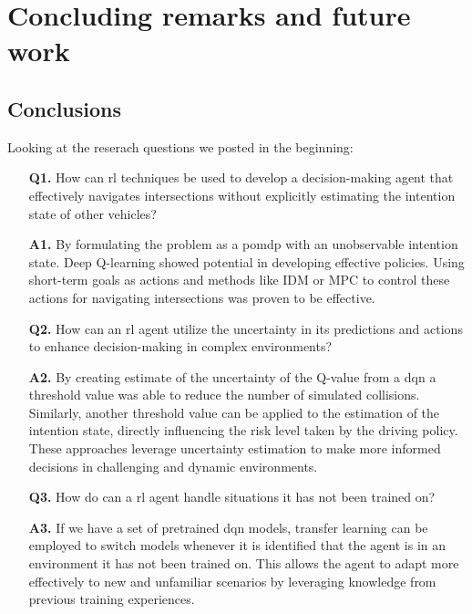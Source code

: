 \chapter{Concluding remarks and future work}
\section{Conclusions}\label{ch:conclusion}
Looking at the reserach questions we posted in the beginning: 
\begin{enumerate}
	\item[\textbf{Q1.}] How can \gls{rl} techniques be used to develop a decision-making agent that effectively navigates intersections without explicitly estimating the intention state of other vehicles? 
	\item[\textbf{A1.}]By formulating the problem as a \gls{pomdp} with an unobservable intention state. Deep Q-learning showed potential in developing effective policies. Using short-term goals as actions and methods like IDM or MPC to control these actions for navigating intersections was proven to be effective.
	\item[\textbf{Q2.}] How can an \gls{rl} agent utilize the uncertainty in its predictions and actions to enhance decision-making in complex environments? 
	\item[\textbf{A2.}] By creating estimate of the uncertainty of the Q-value from a \gls{dqn} a threshold value was able to reduce the number of simulated collisions. Similarly, another threshold  value can be applied to the estimation of the intention state, directly influencing the risk level taken by the driving policy. These approaches leverage uncertainty estimation to make more informed decisions in challenging and dynamic environments.
	\item[\textbf{Q3.}] How do can a \gls{rl} agent handle situations it has not been trained on? 
	\item[\textbf{A3.}] If we have a set of pretrained \gls{dqn} models, transfer learning can be employed to switch models whenever it is identified that the agent is in an environment it has not been trained on. This allows the agent to adapt more effectively to new and unfamiliar scenarios by leveraging knowledge from previous training experiences.
\end{enumerate}



